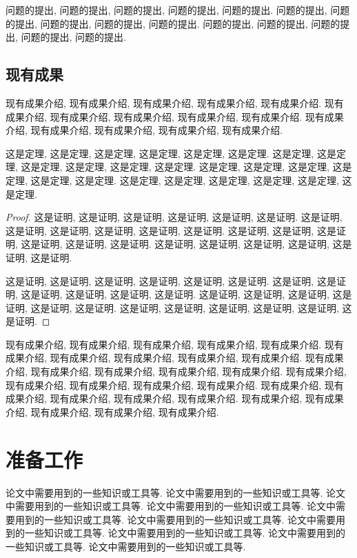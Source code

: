 \documentclass{ecnumaster}
\begin{document}
问题的提出, 问题的提出, 问题的提出, 问题的提出, 问题的提出.
问题的提出, 问题的提出, 问题的提出, 问题的提出, 问题的提出.
问题的提出, 问题的提出, 问题的提出, 问题的提出, 问题的提出.

\section{现有成果}
现有成果介绍, 现有成果介绍, 现有成果介绍, 现有成果介绍, 现有成果介绍.
现有成果介绍, 现有成果介绍, 现有成果介绍, 现有成果介绍, 现有成果介绍.
现有成果介绍, 现有成果介绍, 现有成果介绍, 现有成果介绍, 现有成果介绍.

\begin{theorem}
  这是定理, 这是定理, 这是定理, 这是定理, 这是定理, 这是定理.
  这是定理, 这是定理, 这是定理, 这是定理, 这是定理, 这是定理.
  这是定理, 这是定理, 这是定理, 这是定理, 这是定理, 这是定理.
  这是定理, 这是定理, 这是定理, 这是定理, 这是定理, 这是定理.
\end{theorem}
\begin{proof}
  这是证明, 这是证明, 这是证明, 这是证明, 这是证明, 这是证明.
  这是证明, 这是证明, 这是证明, 这是证明, 这是证明, 这是证明.
  这是证明, 这是证明, 这是证明, 这是证明, 这是证明, 这是证明.
  这是证明, 这是证明, 这是证明, 这是证明, 这是证明, 这是证明.

  这是证明, 这是证明, 这是证明, 这是证明, 这是证明, 这是证明.
  这是证明, 这是证明, 这是证明, 这是证明, 这是证明, 这是证明.
  这是证明, 这是证明, 这是证明, 这是证明, 这是证明, 这是证明.
  这是证明, 这是证明, 这是证明, 这是证明, 这是证明, 这是证明.
\end{proof}

现有成果介绍, 现有成果介绍, 现有成果介绍, 现有成果介绍, 现有成果介绍.
现有成果介绍, 现有成果介绍, 现有成果介绍, 现有成果介绍, 现有成果介绍.
现有成果介绍, 现有成果介绍, 现有成果介绍, 现有成果介绍, 现有成果介绍.
现有成果介绍, 现有成果介绍, 现有成果介绍, 现有成果介绍, 现有成果介绍.
现有成果介绍, 现有成果介绍, 现有成果介绍, 现有成果介绍, 现有成果介绍.
现有成果介绍, 现有成果介绍, 现有成果介绍, 现有成果介绍, 现有成果介绍.

\chapter{准备工作}

论文中需要用到的一些知识或工具等. 论文中需要用到的一些知识或工具等.
论文中需要用到的一些知识或工具等. 论文中需要用到的一些知识或工具等.
论文中需要用到的一些知识或工具等. 论文中需要用到的一些知识或工具等.
论文中需要用到的一些知识或工具等. 论文中需要用到的一些知识或工具等.
论文中需要用到的一些知识或工具等. 论文中需要用到的一些知识或工具等.
\end{document}
